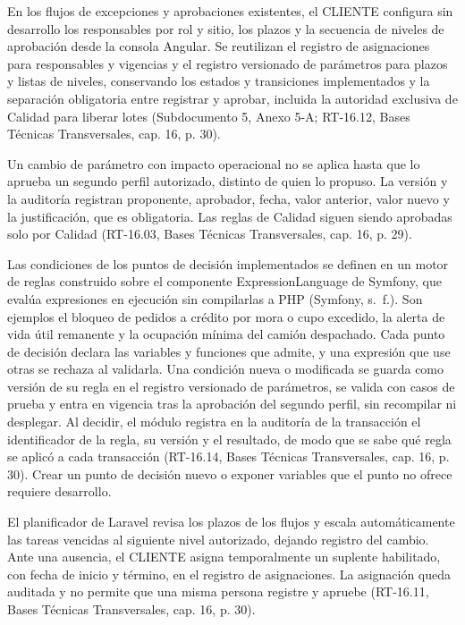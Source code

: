 En los flujos de excepciones y aprobaciones existentes, el CLIENTE configura sin desarrollo los responsables por rol y sitio, los plazos y la secuencia de niveles de aprobación desde la consola Angular. Se reutilizan el registro de asignaciones para responsables y vigencias y el registro versionado de parámetros para plazos y listas de niveles, conservando los estados y transiciones implementados y la separación obligatoria entre registrar y aprobar, incluida la autoridad exclusiva de Calidad para liberar lotes (Subdocumento 5, Anexo 5-A; RT-16.12, Bases Técnicas Transversales, cap. 16, p. 30).

Un cambio de parámetro con impacto operacional no se aplica hasta que lo aprueba un segundo perfil autorizado, distinto de quien lo propuso. La versión y la auditoría registran proponente, aprobador, fecha, valor anterior, valor nuevo y la justificación, que es obligatoria. Las reglas de Calidad siguen siendo aprobadas solo por Calidad (RT-16.03, Bases Técnicas Transversales, cap. 16, p. 29).

Las condiciones de los puntos de decisión implementados se definen en un motor de reglas construido sobre el componente ExpressionLanguage de Symfony, que evalúa expresiones en ejecución sin compilarlas a PHP (Symfony, s.~f.). Son ejemplos el bloqueo de pedidos a crédito por mora o cupo excedido, la alerta de vida útil remanente y la ocupación mínima del camión despachado. Cada punto de decisión declara las variables y funciones que admite, y una expresión que use otras se rechaza al validarla. Una condición nueva o modificada se guarda como versión de su regla en el registro versionado de parámetros, se valida con casos de prueba y entra en vigencia tras la aprobación del segundo perfil, sin recompilar ni desplegar. Al decidir, el módulo registra en la auditoría de la transacción el identificador de la regla, su versión y el resultado, de modo que se sabe qué regla se aplicó a cada transacción (RT-16.14, Bases Técnicas Transversales, cap. 16, p. 30). Crear un punto de decisión nuevo o exponer variables que el punto no ofrece requiere desarrollo.

El planificador de Laravel revisa los plazos de los flujos y escala automáticamente las tareas vencidas al siguiente nivel autorizado, dejando registro del cambio. Ante una ausencia, el CLIENTE asigna temporalmente un suplente habilitado, con fecha de inicio y término, en el registro de asignaciones. La asignación queda auditada y no permite que una misma persona registre y apruebe (RT-16.11, Bases Técnicas Transversales, cap. 16, p. 30).

